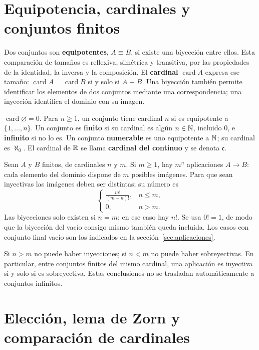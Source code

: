 \section{Equipotencia, cardinales y conjuntos finitos}
\label{sec:cardinalidad}

Dos conjuntos son \textbf{equipotentes}, $A\equiv B$, si existe una
biyección entre ellos. Esta comparación de tamaños es reflexiva,
simétrica y transitiva, por las propiedades de la identidad,
la inversa y la composición. El \textbf{cardinal} $\operatorname{card}A$
expresa ese tamaño: $\operatorname{card}A=\operatorname{card}B$
si y solo si $A\equiv B$.
Una biyección también permite identificar los elementos de dos conjuntos
mediante una correspondencia; una inyección identifica el dominio con su imagen.

$\operatorname{card}\varnothing=0$. Para $n\ge1$, un conjunto tiene
cardinal $n$ si es equipotente a $\{1,\ldots,n\}$.
Un conjunto es \textbf{finito} si su cardinal es algún $n\in\mathbb{N}$,
incluido $0$, e \textbf{infinito} si no lo es.
Un conjunto \textbf{numerable} es uno equipotente a $\mathbb{N}$;
su cardinal es $\aleph_0$. El cardinal de $\mathbb{R}$ se llama
\textbf{cardinal del continuo} y se denota $\mathfrak c$.

Sean $A$ y $B$ finitos, de cardinales $n$ y $m$.
Si $m\ge1$, hay $m^n$ aplicaciones $A\to B$:
cada elemento del dominio dispone de $m$ posibles imágenes.
Para que sean inyectivas las imágenes deben ser distintas; su número es
\[
 \begin{cases}
 \displaystyle\frac{m!}{(m-n)!},&n\le m,\\[4pt]
 0,&n>m.
 \end{cases}
\]
Las biyecciones solo existen si $n=m$; en ese caso hay $n!$.
Se usa $0!=1$, de modo que la biyección del vacío consigo mismo
también queda incluida. Los casos con conjunto final vacío son los
indicados en la sección~\ref{sec:aplicaciones}.

Si $n>m$ no puede haber inyecciones; si $n<m$ no puede haber
sobreyectivas. En particular, entre conjuntos finitos del mismo cardinal,
una aplicación es inyectiva si y solo si es sobreyectiva.
Estas conclusiones no se trasladan automáticamente a conjuntos infinitos.

\newpage
\section{Elección, lema de Zorn y comparación de cardinales}
\label{sec:eleccion-cardinales}

